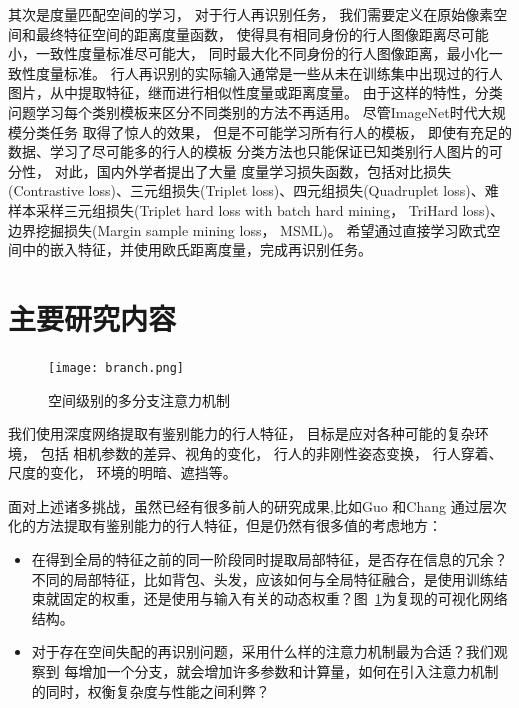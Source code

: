 其次是度量匹配空间的学习，
对于行人再识别任务，
我们需要定义在原始像素空间和最终特征空间的距离度量函数，
使得具有相同身份的行人图像距离尽可能小，一致性度量标准尽可能大，
同时最大化不同身份的行人图像距离，最小化一致性度量标准。
行人再识别的实际输入通常是一些从未在训练集中出现过的行人图片，从中提取特征，继而进行相似性度量或距离度量。
由于这样的特性，分类问题学习每个类别模板来区分不同类别的方法不再适用。 
尽管ImageNet时代大规模分类任务\cite{deng2009imagenet}
取得了惊人的效果，
但是不可能学习所有行人的模板，
即使有充足的数据、学习了尽可能多的行人的模板
分类方法也只能保证已知类别行人图片的可分性，
对此，国内外学者提出了大量
度量学习损失函数，包括对比损失(Contrastive loss)\cite{varior2016gated}、三元组损失(Triplet loss)\cite{schroff2015facenet}、四元组损失(Quadruplet loss)\cite{chen2017beyond}、难样本采样三元组损失(Triplet hard loss with batch hard mining， TriHard loss)\cite{hermans2017defense}、边界挖掘损失(Margin sample mining loss， MSML)\cite{xiao2017margin}。
希望通过直接学习欧式空间中的嵌入特征，并使用欧氏距离度量，完成再识别任务。

\section{主要研究内容}

\begin{figure}
	\centering 
	\texttt{[image: branch.png]}
	\caption{空间级别的多分支注意力机制} \label{fig:branch}
\end{figure}

我们使用深度网络提取有鉴别能力的行人特征，
目标是应对各种可能的复杂环境，
包括
相机参数的差异、视角的变化，
行人的非刚性姿态变换，
行人穿着、尺度的变化，
环境的明暗、遮挡等。

面对上述诸多挑战，虽然已经有很多前人的研究成果,比如Guo \etal\cite{guo2018multilevel}和Chang \etal\cite{chang2018factor}通过层次化的方法提取有鉴别能力的行人特征，但是仍然有很多值的考虑地方：

\begin{itemize}
	\item \cite{zhao2017part} 在得到全局的特征之前的同一阶段同时提取局部特征，是否存在信息的冗余？
	      不同的局部特征，比如背包、头发，应该如何与全局特征融合，是使用训练结束就固定的权重，还是使用与输入有关的动态权重？图~\ref{fig:branch}为复现\cite{zhao2017part}的可视化网络结构。
	\item 对于存在空间失配的再识别问题，采用什么样的注意力机制最为合适？我们观察到\cite{zhao2017part} 每增加一个分支，就会增加许多参数和计算量，如何在引入注意力机制的同时，权衡复杂度与性能之间利弊？
\end{itemize}

